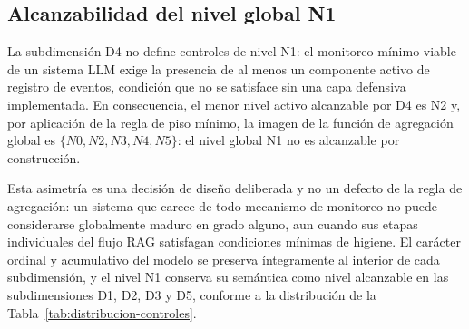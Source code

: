\subsection{Alcanzabilidad del nivel global N1}
\label{mad:alcanzabilidad-n1}

La subdimensión D4 no define controles de nivel N1: el monitoreo mínimo viable de un sistema LLM exige la presencia de al menos un componente activo de registro de eventos, condición que no se satisface sin una capa defensiva implementada. En consecuencia, el menor nivel activo alcanzable por D4 es N2 y, por aplicación de la regla de piso mínimo, la imagen de la función de agregación global es $\{N0, N2, N3, N4, N5\}$: el nivel global N1 no es alcanzable por construcción.

Esta asimetría es una decisión de diseño deliberada y no un defecto de la regla de agregación: un sistema que carece de todo mecanismo de monitoreo no puede considerarse globalmente maduro en grado alguno, aun cuando sus etapas individuales del flujo RAG satisfagan condiciones mínimas de higiene. El carácter ordinal y acumulativo del modelo se preserva íntegramente al interior de cada subdimensión, y el nivel N1 conserva su semántica como nivel alcanzable en las subdimensiones D1, D2, D3 y D5, conforme a la distribución de la Tabla~\ref{tab:distribucion-controles}.
